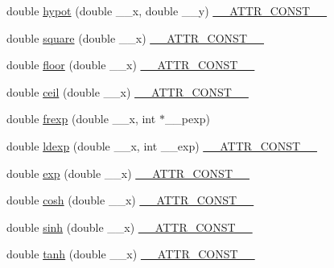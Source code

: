 \begin{DoxyCompactItemize}
\item 
double \hyperlink{group__avr__math_gacb9c5b29c1ee2aed4d0f2d412a12f777}{hypot} (double \+\_\+\+\_\+x, double \+\_\+\+\_\+y) \hyperlink{group__avr__math_ga87f6b1b3880d945610873b9da382e5d4}{\+\_\+\+\_\+\+A\+T\+T\+R\+\_\+\+C\+O\+N\+S\+T\+\_\+\+\_\+}
\item 
double \hyperlink{group__avr__math_gabb95d8256ff81d58f092c065ea204293}{square} (double \+\_\+\+\_\+x) \hyperlink{group__avr__math_ga87f6b1b3880d945610873b9da382e5d4}{\+\_\+\+\_\+\+A\+T\+T\+R\+\_\+\+C\+O\+N\+S\+T\+\_\+\+\_\+}
\item 
double \hyperlink{group__avr__math_ga4fdf30fdaae0cbccc44343184457464d}{floor} (double \+\_\+\+\_\+x) \hyperlink{group__avr__math_ga87f6b1b3880d945610873b9da382e5d4}{\+\_\+\+\_\+\+A\+T\+T\+R\+\_\+\+C\+O\+N\+S\+T\+\_\+\+\_\+}
\item 
double \hyperlink{group__avr__math_gaf3602dd198f88f5a571f62936fd6b5cc}{ceil} (double \+\_\+\+\_\+x) \hyperlink{group__avr__math_ga87f6b1b3880d945610873b9da382e5d4}{\+\_\+\+\_\+\+A\+T\+T\+R\+\_\+\+C\+O\+N\+S\+T\+\_\+\+\_\+}
\item 
double \hyperlink{group__avr__math_ga89f0cb053e3cdb0c9c952ef040087c80}{frexp} (double \+\_\+\+\_\+x, int $\ast$\+\_\+\+\_\+pexp)
\item 
double \hyperlink{group__avr__math_ga71765b713504b7c380b1720e0ac909cc}{ldexp} (double \+\_\+\+\_\+x, int \+\_\+\+\_\+exp) \hyperlink{group__avr__math_ga87f6b1b3880d945610873b9da382e5d4}{\+\_\+\+\_\+\+A\+T\+T\+R\+\_\+\+C\+O\+N\+S\+T\+\_\+\+\_\+}
\item 
double \hyperlink{group__avr__math_gab7e32d20a0c6089375c9a088e819d1fb}{exp} (double \+\_\+\+\_\+x) \hyperlink{group__avr__math_ga87f6b1b3880d945610873b9da382e5d4}{\+\_\+\+\_\+\+A\+T\+T\+R\+\_\+\+C\+O\+N\+S\+T\+\_\+\+\_\+}
\item 
double \hyperlink{group__avr__math_ga9b61c968b8ce23a16b64b4e10cdb9970}{cosh} (double \+\_\+\+\_\+x) \hyperlink{group__avr__math_ga87f6b1b3880d945610873b9da382e5d4}{\+\_\+\+\_\+\+A\+T\+T\+R\+\_\+\+C\+O\+N\+S\+T\+\_\+\+\_\+}
\item 
double \hyperlink{group__avr__math_ga00265cea3ae92c52d2aa9cc32f2e6557}{sinh} (double \+\_\+\+\_\+x) \hyperlink{group__avr__math_ga87f6b1b3880d945610873b9da382e5d4}{\+\_\+\+\_\+\+A\+T\+T\+R\+\_\+\+C\+O\+N\+S\+T\+\_\+\+\_\+}
\item 
double \hyperlink{group__avr__math_ga97f0f3ecd653766bd1a94910cb0cad9f}{tanh} (double \+\_\+\+\_\+x) \hyperlink{group__avr__math_ga87f6b1b3880d945610873b9da382e5d4}{\+\_\+\+\_\+\+A\+T\+T\+R\+\_\+\+C\+O\+N\+S\+T\+\_\+\+\_\+}

\end{DoxyCompactItemize}
